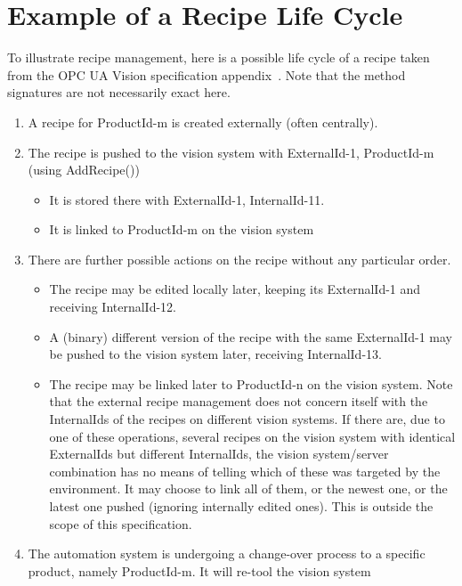 \chapter{Example of a Recipe Life Cycle}
\label{chap:recipelifecycle}
To illustrate recipe management, here is a possible life cycle of a recipe taken from the OPC UA Vision specification appendix~\cite{VDMA2018OPC40100-1:2018-11}. Note that the method signatures are not necessarily exact here. 
\begin{enumerate}
    \item A recipe for ProductId-m is created externally (often centrally). 
    \item The recipe is pushed to the vision system with ExternalId-1, ProductId-m (using AddRecipe())
    \begin{itemize}
        \item It is stored there with ExternalId-1, InternalId-11.
        \item It is linked to ProductId-m on the vision system
    \end{itemize}
    \item There are further possible actions on the recipe without any particular order.
    \begin{itemize}
        \item The recipe may be edited locally later, keeping its ExternalId-1 and receiving InternalId-12.
        \item A (binary) different version of the recipe with the same ExternalId-1 may be pushed to the vision system later, receiving InternalId-13.
        \item The recipe may be linked later to ProductId-n on the vision system. Note that the external recipe 
        management does not concern itself with the InternalIds of the recipes on different vision systems. If 
        there are, due to one of these operations, several recipes on the vision system with identical 
        ExternalIds but different InternalIds, the vision system/server combination has no means of telling 
        which of these was targeted by the environment. It may choose to link all of them, or the newest one, 
        or the latest one pushed (ignoring internally edited ones). This is outside the scope of this specification.
    \end{itemize}
    \item The automation system is undergoing a change-over process to a specific product, namely ProductId-m. It 
    will re-tool the vision system
    \begin{itemize}

\end{itemize}
\end{enumerate}
